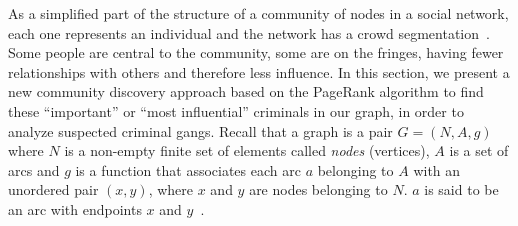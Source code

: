 As a simplified part of the structure of a community of nodes in a social network, each one represents an individual and the network has a crowd segmentation~\cite{ma2014exploring}. Some people are central to the community, some are on the fringes, having fewer relationships with others and therefore less influence. In this section, we present a new community discovery approach based on the PageRank algorithm to find these ``important'' or ``most influential'' criminals in our graph, in order to analyze suspected criminal gangs.
Recall that a graph is a pair $G = (N, A, g)$ where $N$ is a non-empty finite set of elements called \textit{nodes} (vertices), $A$ is a set of arcs and $ g$ is a function that associates each arc $a$ belonging to $A$ with an unordered pair $(x, y)$, where $x$ and $y$ are nodes belonging to $N$. $a$ is said to be an arc with endpoints $x$ and $y$~\cite{dubinsky1984mathematical}.

